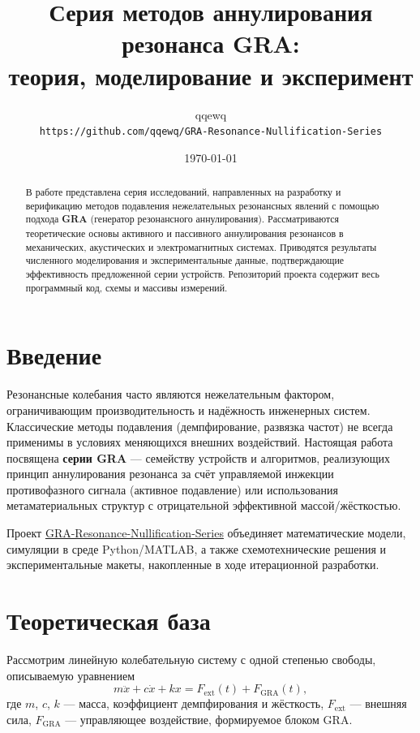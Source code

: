 \documentclass[a4paper,12pt]{article}
\title{\textbf{Серия методов аннулирования резонанса GRA:}\\
теория, моделирование и эксперимент}
\author{qqewq\\[2mm]
\small \texttt{https://github.com/qqewq/GRA-Resonance-Nullification-Series}}
\date{\today}
\begin{document}
\maketitle

\begin{abstract}
В работе представлена серия исследований, направленных на разработку и верификацию методов подавления нежелательных резонансных явлений с помощью подхода \textbf{GRA} (генератор резонансного аннулирования). Рассматриваются теоретические основы активного и пассивного аннулирования резонансов в механических, акустических и электромагнитных системах. Приводятся результаты численного моделирования и экспериментальные данные, подтверждающие эффективность предложенной серии устройств. Репозиторий проекта содержит весь программный код, схемы и массивы измерений.
\end{abstract}

\section{Введение}
Резонансные колебания часто являются нежелательным фактором, ограничивающим производительность и надёжность инженерных систем. Классические методы подавления (демпфирование, развязка частот) не всегда применимы в условиях меняющихся внешних воздействий. Настоящая работа посвящена \textbf{серии GRA} — семейству устройств и алгоритмов, реализующих принцип аннулирования резонанса за счёт управляемой инжекции противофазного сигнала (активное подавление) или использования метаматериальных структур с отрицательной эффективной массой/жёсткостью.

Проект \href{https://github.com/qqewq/GRA-Resonance-Nullification-Series}{GRA-Resonance-Nullification-Series} объединяет математические модели, симуляции в среде Python/MATLAB, а также схемотехнические решения и экспериментальные макеты, накопленные в ходе итерационной разработки.

\section{Теоретическая база}
Рассмотрим линейную колебательную систему с одной степенью свободы, описываемую уравнением
\begin{equation}
m\ddot{x} + c\dot{x} + kx = F_{\text{ext}}(t) + F_{\text{GRA}}(t),
\label{eq:motion}
\end{equation}
где $m$, $c$, $k$ — масса, коэффициент демпфирования и жёсткость, $F_{\text{ext}}$ — внешняя сила, $F_{\text{GRA}}$ — управляющее воздействие, формируемое блоком GRA.
\end{document}
